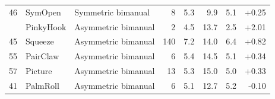 \begin{table}[h]
\begin{tabular}{rllrrrrr}
46 & SymOpen & Symmetric bimanual & 8 & 5.3 & 9.9 & 5.1 & +0.25 \\
\addlinespace[3pt]
43 & PinkyHook & Asymmetric bimanual & 2 & 4.5 & 13.7 & 2.5 & +2.01 \\
45 & Squeeze & Asymmetric bimanual & 140 & 7.2 & 14.0 & 6.4 & +0.82 \\
55 & PairClaw & Asymmetric bimanual & 6 & 5.4 & 14.5 & 5.1 & +0.34 \\
57 & Picture & Asymmetric bimanual & 13 & 5.3 & 15.0 & 5.0 & +0.33 \\
41 & PalmRoll & Asymmetric bimanual & 6 & 5.1 & 12.7 & 5.2 & -0.10 \\
\bottomrule
\end{tabular}
\end{table}